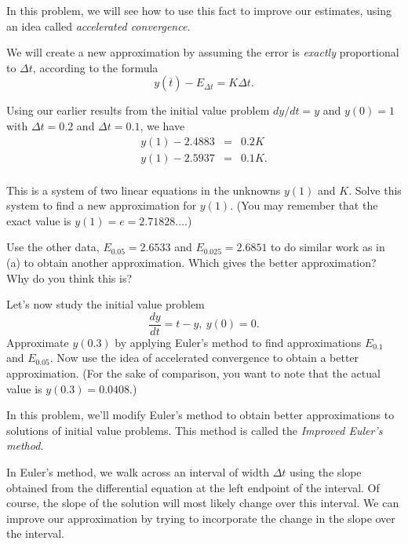 \begin{exercises}
    In this problem, we will see how to use this fact to improve our
    estimates, using an idea called {\em accelerated convergence}.

    \ba
    \item  We will create a new approximation by assuming the error is
    {\em exactly} proportional to $\Delta t$, according to the formula
    $$y(\overline{t})-E_{\Delta t} =K\Delta t.
    $$
    
    Using our earlier results from the initial value problem $dy/dt = y$ and
    $y(0)=1$ with $\Delta t = 0.2$ and $\Delta t = 0.1$, we have
    \begin{eqnarray*}
      y(1) - 2.4883 & = & 0.2K \\
      y(1) - 2.5937 & = & 0.1K. \\
    \end{eqnarray*}

    This is a system of two linear equations in the unknowns $y(1)$
    and $K$.  Solve this system to find a new approximation for
    $y(1)$.  (You may remember that the exact value is $y(1) = e =
    2.71828\ldots.$)

    \item Use the other data, $E_{0.05} = 2.6533$ and $E_{0.025} = 2.6851$
    to do similar work as in (a) to obtain another approximation.  Which gives the better
    approximation?  Why do you think this is?

    \item  Let's now study the initial value problem
    $$
      \frac{dy}{dt} = t-y, \ y(0) = 0.
    $$
    Approximate $y(0.3)$ by applying Euler's method to find
    approximations $E_{0.1}$ and $E_{0.05}$.  Now use the idea of
    accelerated convergence to obtain a better approximation.  (For the sake of comparison, you want to  note that the actual value is $y(0.3) =
    0.0408$.) 

\ea

  \item  In this problem, we'll modify Euler's method to obtain better
    approximations to solutions of initial value problems.  This
    method is called the {\em Improved Euler's method.}

    In Euler's method, we walk across an interval of width $\Delta t$
    using the slope obtained from the differential equation at the
    left endpoint of the interval.  Of course, the slope of the
    solution will most likely change over this interval.  We can
    improve our approximation by trying to incorporate the change in
    the slope over the interval.


\end{exercises}
